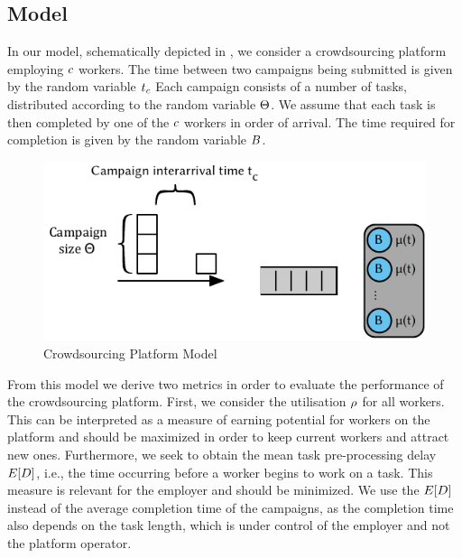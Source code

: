 \subsection{Model}\label{sec:cloud:crowdsourcing:model}

In our model, schematically depicted in , we consider a crowdsourcing  platform employing \(c\) workers.
The time between two campaigns being submitted is given by the random variable \(t_c\)
Each campaign consists of a number of tasks, distributed according to the random variable \(\Theta\).
We assume that each task is then completed by one of the \(c\) workers in order of arrival.
The time required for completion is given by the random variable \(B\).

\begin{figure}
  \centering
  \includegraphics{cloud/crowdsourcing/model/figures/model}
  \caption{Crowdsourcing Platform Model}
  \label{fig:sec:cloud:crowdsourcing:model:model}
\end{figure}

From this model we derive two metrics in order to evaluate the performance of the crowdsourcing platform.
First, we consider the utilisation \(\rho\) for all workers.
This can be interpreted as a measure of earning potential for workers on the platform and should be maximized in order to keep current workers and attract new ones. 
Furthermore, we seek to obtain the mean task pre-processing delay \(E[D]\), i.e., the time occurring before a worker begins to work on a task.
This measure is relevant for the employer and should be minimized.
We use the \(E[D]\) instead of the average completion time of the campaigns, as the completion time also depends on the task length, which is under control of the employer and not the platform operator.


